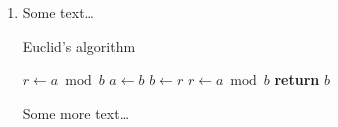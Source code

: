 \documentclass{article}
\begin{document}
\begin{enumerate} 
  \item Some text\ldots\par
  \vspace{-\baselineskip}

  \begin{minipage}{\linewidth}
  \begin{algorithm}[H]
    \caption{Euclid’s algorithm}\label{euclid}
    \begin{algorithmic}[1]
        \State $r\gets a\bmod b$
          \State $a\gets b$
          \State $b\gets r$
          \State $r\gets a\bmod b$
        \EndWhile\label{euclidendwhile}
        \State \textbf{return} $b$
      \EndProcedure
    \end{algorithmic}
  \end{algorithm}
  \end{minipage}

  Some more text\ldots
\end{enumerate}
\end{document}
